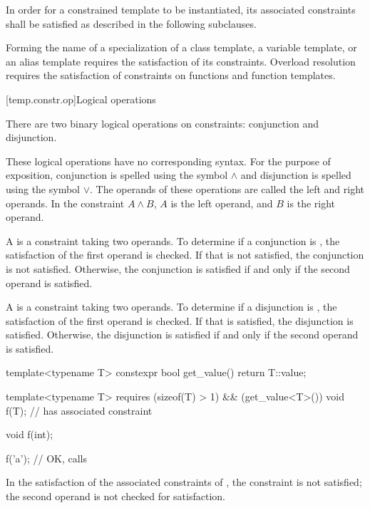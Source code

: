 \pnum
In order for a constrained template to be instantiated,
its associated constraints
shall be satisfied as described in the following subclauses.
\begin{note}
Forming the name of a specialization of
a class template,
a variable template, or
an alias template
requires the satisfaction of its constraints.
Overload resolution
requires the satisfaction of constraints
on functions and function templates.
\end{note}

[temp.constr.op]{Logical operations}

\pnum
There are two binary logical operations on constraints: conjunction
and disjunction.
\begin{note}
These logical operations have no corresponding \Cpp{} syntax.
For the purpose of exposition, conjunction is spelled
using the symbol $\land$ and disjunction is spelled using the
symbol $\lor$.
The operands of these operations are called the left
and right operands. In the constraint $A \land B$,
$A$ is the left operand, and $B$ is the right operand.
\end{note}

\pnum
A  is a constraint taking two
operands.
To determine if a conjunction is
,
the satisfaction of
the first operand is checked.
If that is not satisfied, the conjunction is not satisfied.
Otherwise, the conjunction is satisfied if and only if the second
operand is satisfied.

\pnum
A  is a constraint taking two
operands.
%
To determine if a disjunction is
,
the satisfaction of
the first operand is checked.
If that is satisfied, the disjunction is satisfied.
Otherwise, the disjunction is satisfied if and only if the second
operand is satisfied.

\pnum
\begin{example}
\begin{codeblock}
template<typename T>
  constexpr bool get_value() { return T::value; }

template<typename T>
  requires (sizeof(T) > 1) && (get_value<T>())
    void f(T);      // has associated constraint 

void f(int);

f('a'); // OK, calls 
\end{codeblock}
In the satisfaction of the associated constraints
of , the constraint  is not satisfied;
the second operand is not checked for satisfaction.
\end{example}

